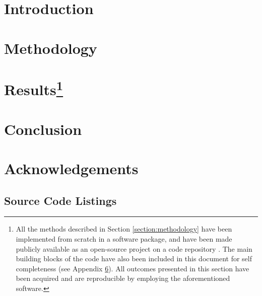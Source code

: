 \documentclass{article}
\begin{document}

\newpage

\newpage
\tableofcontents

\newpage
\section{Introduction}

\newpage
\section{Methodology\label{section:methodology}}

\newpage
\section{Results\label{section:results}\protect\footnote[1]{All the methods described in Section \ref{section:methodology} have been implemented from scratch in a software package, and have been made publicly available as an open-source project on a code repository \cite{software2023}. The main building blocks of the code have also been included in this document for self completeness (see Appendix \ref{section:source}). All outcomes presented in this section have been acquired and are reproducible by employing the aforementioned software.}}

\newpage
\section{Conclusion}

\newpage
\section{Acknowledgements}


\newpage
\printbibliography[heading=bibintoc, title={References}]
\newpage
\begin{appendices}
\section{Source Code Listings}\label{section:source}

\end{appendices}
\end{document}
